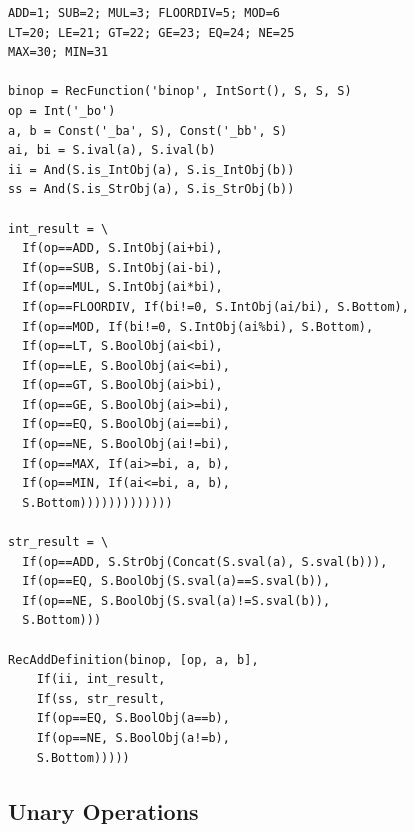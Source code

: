 \documentclass[11pt,a4paper]{report}
\theoremstyle{definition}
\theoremstyle{plain}
\begin{document}
\begin{lstlisting}[caption={binop: complete Z3 implementation}]
ADD=1; SUB=2; MUL=3; FLOORDIV=5; MOD=6
LT=20; LE=21; GT=22; GE=23; EQ=24; NE=25
MAX=30; MIN=31

binop = RecFunction('binop', IntSort(), S, S, S)
op = Int('_bo')
a, b = Const('_ba', S), Const('_bb', S)
ai, bi = S.ival(a), S.ival(b)
ii = And(S.is_IntObj(a), S.is_IntObj(b))
ss = And(S.is_StrObj(a), S.is_StrObj(b))

int_result = \
  If(op==ADD, S.IntObj(ai+bi),
  If(op==SUB, S.IntObj(ai-bi),
  If(op==MUL, S.IntObj(ai*bi),
  If(op==FLOORDIV, If(bi!=0, S.IntObj(ai/bi), S.Bottom),
  If(op==MOD, If(bi!=0, S.IntObj(ai%bi), S.Bottom),
  If(op==LT, S.BoolObj(ai<bi),
  If(op==LE, S.BoolObj(ai<=bi),
  If(op==GT, S.BoolObj(ai>bi),
  If(op==GE, S.BoolObj(ai>=bi),
  If(op==EQ, S.BoolObj(ai==bi),
  If(op==NE, S.BoolObj(ai!=bi),
  If(op==MAX, If(ai>=bi, a, b),
  If(op==MIN, If(ai<=bi, a, b),
  S.Bottom)))))))))))))

str_result = \
  If(op==ADD, S.StrObj(Concat(S.sval(a), S.sval(b))),
  If(op==EQ, S.BoolObj(S.sval(a)==S.sval(b)),
  If(op==NE, S.BoolObj(S.sval(a)!=S.sval(b)),
  S.Bottom)))

RecAddDefinition(binop, [op, a, b],
    If(ii, int_result,
    If(ss, str_result,
    If(op==EQ, S.BoolObj(a==b),
    If(op==NE, S.BoolObj(a!=b),
    S.Bottom)))))
\end{lstlisting}

\subsection{Unary Operations}
\end{document}
